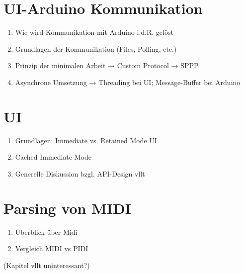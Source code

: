 
\section{UI-Arduino Kommunikation} \label{vorgehenSW-SPPP}
\begin{enumerate}
	\item Wie wird Kommunikation mit Arduino i.d.R. gelöst
	\item Grundlagen der Kommunikation (Files, Polling, etc.)
	\item Prinzip der minimalen Arbeit → Custom Protocol → SPPP
	\item Asynchrone Umsetzung → Threading bei UI; Message-Buffer bei Arduino
\end{enumerate}

\section{UI} \label{vorgehenSW-UI}
\begin{enumerate}
	\item Grundlagen: Immediate vs. Retained Mode UI
	\item Cached Immediate Mode
	\item Generelle Diskussion bzgl. API-Design vllt
\end{enumerate}

\section{Parsing von MIDI} \label{vorgehenSW-MIDI}
\begin{enumerate}
	\item Überblick über Midi
	\item Vergleich MIDI vs PIDI
\end{enumerate}
(Kapitel vllt uninteressant?)